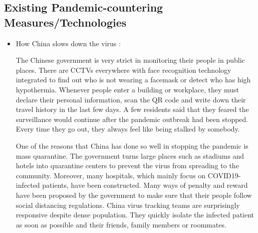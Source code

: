     \subsection{Existing Pandemic-countering Measures/Technologies}
      \begin{itemize}
        \item How China slows down the virus \parencite{ChinasMeasure1} \parencite{ChinasMeasure2}:
        \par The Chinese government is very strict in monitoring their people in public places. There are CCTVs everywhere with face recognition technology integrated to find out who is not wearing a facemask or detect who has high hypothermia. Whenever people enter a building or workplace, they must declare their personal information, scan the QR code and write down their travel history in the last few days. A few residents said that they feared the surveillance would continue after the pandemic outbreak had been stopped. Every time they go out, they always feel like being stalked by somebody.
        \par One of the reasons that China has done so well in stopping the pandemic is mass quarantine. The government turns large places such as stadiums and hotels into quarantine centers to prevent the virus from spreading to the community. Moreover, many hospitals, which mainly focus on COVID19-infected patients, have been constructed. Many ways of penalty and reward have been proposed by the government to make sure that their people follow social distancing regulations. China virus tracking teams are surprisingly responsive despite dense population. They quickly isolate the infected patient as soon as possible and their friends, family members or roommates.


\end{itemize}
